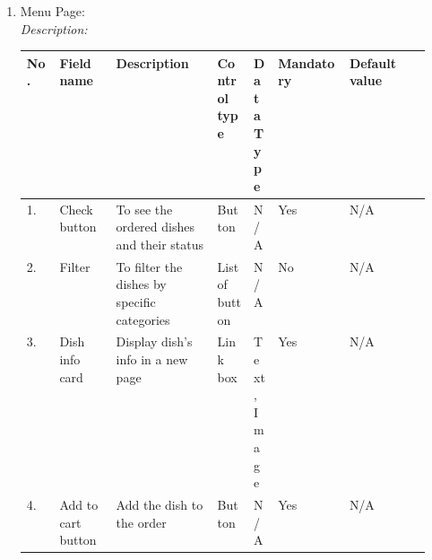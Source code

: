 \documentclass[a4paper,11pt]{extarticle}
\begin{document}
\begin{enumerate}[wide=0pt]
    \item Menu Page: \\
    \emph{Description:}  \\
    \begin{tabularx}{\textwidth}{|l|p{0.14\linewidth}|p{0.25\linewidth}|p{0.09\linewidth}|p{0.065\linewidth}|l|X|}
    \hline
    \textbf{No.} & \textbf{Field name} & \textbf{Description} & \textbf{Control type} & \textbf{Data Type} & \textbf{Mandatory} & \textbf{Default value} \\
    \hline
    1. & Check button & To see the ordered dishes and their status & Button & N/A & Yes & N/A \\
    \hline
    2. & Filter & To filter the dishes by specific categories & List of button & N/A & No & N/A \\ 
    \hline
    3. & Dish info card & Display dish's info in a new page & Link box & Text, Image & Yes & N/A \\ 
    \hline
    4. & Add to cart button & Add the dish to the order & Button & N/A & Yes & N/A \\
    \hline
    
    \end{tabularx}
    \begin{figure}[htbp]
            \centering
            
\end{figure}
\end{enumerate}
\end{document}
